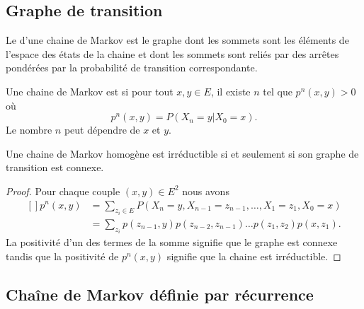 \subsection{Graphe de transition}

Le  d'une chaine de Markov est le graphe dont les sommets sont les éléments de l'espace des états de la chaine et dont les sommets sont reliés par des arrêtes pondérées par la probabilité de transition correspondante.

\begin{definition}
	Une chaine de Markov est  si pour tout \( x,y\in E\), il existe \( n\) tel que \( p^n(x,y)>0\) où
	\begin{equation}
		p^n(x,y)=P(X_n=y|X_0=x).
	\end{equation}
	Le nombre \( n\) peut dépendre de \( x\) et \( y\).
\end{definition}

\begin{lemma}
	Une chaine de Markov homogène est irréductible si et seulement si son graphe de transition est connexe.
\end{lemma}

\begin{proof}
	Pour chaque couple \( (x,y)\in E^2\) nous avons
	\begin{equation}
		\begin{aligned}[]
			p^n(x,y) & =\sum_{z_i\in E}P(X_n=y,X_{n-1}=z_{n-1},\ldots,X_1=z_1,X_0=x)       \\
			         & =\sum_{z_i}p(z_{n-1},y)p(z_{n-2},z_{n-1})\ldots p(z_1,z_2)p(x,z_1).
		\end{aligned}
	\end{equation}
	La positivité d'un des termes de la somme signifie que le graphe est connexe tandis que la positivité de \( p^n(x,y)\) signifie que la chaine est irréductible.
\end{proof}

\subsection{Chaîne de Markov définie par récurrence}

